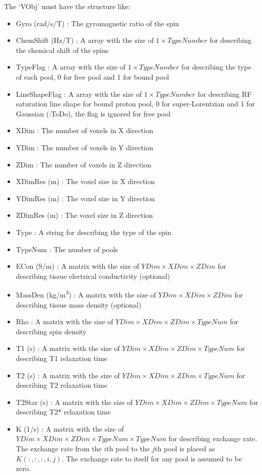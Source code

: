 \documentclass{book}%
\begin{document}
\begin{enumerate}
The `VObj' must have the structure like:
\begin{itemize}
	\item Gyro (rad/s/T) : The gyromagnetic ratio of the spin
	\item ChemShift (Hz/T) : A array with the size of $1 \times TypeNumber $ for describing the chemical shift of the spins
  \item TypeFlag : A array with the size of $1 \times TypeNumber $ for describing the type of each pool, 0 for free pool and 1 for bound pool
	\item LineShapeFlag : A array with the size of $1 \times TypeNumber $ for describing RF saturation line shape for bound proton pool, 0 for super-Lorentzian and 1 for Gaussian (:ToDo), the flag is ignored for free pool
	\item XDim : The number of voxels in X direction
	\item YDim : The number of voxels in Y direction
	\item ZDim : The number of voxels in Z direction
	\item XDimRes (m) : The voxel size in X direction
	\item YDimRes (m) : The voxel size in Y direction
	\item ZDimRes (m) : The voxel size in Z direction
	\item Type : A string for describing the type of the spin
	\item TypeNum : The number of pools
	\item ECon (S/m) : A matrix with the size of $ YDim \times XDim \times ZDim $ for describing tissue electrical conductivity (optional)
	\item MassDen (kg/m\textsuperscript{3}) : A matrix with the size of $ YDim \times XDim \times ZDim $ for describing tissue mass density (optional)
	\item Rho : A matrix with the size of $ YDim \times XDim \times ZDim \times TypeNum $ for describing spin density
	\item T1 (s) : A matrix with the size of $ YDim \times XDim \times ZDim \times TypeNum $ for describing T1 relaxation time
	\item T2 (s) : A matrix with the size of $ YDim \times XDim \times ZDim \times TypeNum $ for describing T2 relaxation time
	\item T2Star (s) : A matrix with the size of $ YDim \times XDim \times ZDim \times TypeNum $ for describing T2* relaxation time
	\item K (1/s) : A matrix with the size of $ YDim \times XDim \times ZDim \times TypeNum \times TypeNum $ for describing exchange rate. The exchange rate from the $i$th pool to the $j$th pool is placed as $K(:,:,:,i,j)$. The exchange rate to itself for any pool is assumed to be zero.
\end{itemize}


\end{enumerate}
\end{document}
